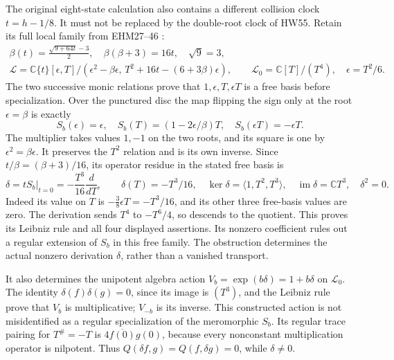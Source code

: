 \documentclass[11pt]{article}
\newcommand{\C}{\mathbb C}
\newcommand{\im}{\operatorname{im}}
\begin{document}
The original eight-state calculation also contains a different
collision clock \(t=h-1/8\). It must not be replaced by the
double-root clock of HW55. Retain its full local family
from EHM27--46 \cite{EHM}:
\[
 \begin{gathered}
 \beta(t)=\frac{\sqrt{9+64t}-3}{2},\quad
 \beta(\beta+3)=16t,\quad \sqrt{9}=3,\\
 \mathscr L=
 \C\{t\}[\epsilon,T]/
       (\epsilon^2-\beta\epsilon,\,
          T^2+16t-(6+3\beta)\epsilon),\qquad
 \mathscr L_0=\C[T]/(T^4),\quad \epsilon=T^2/6 .
 \end{gathered}
 \tag{HW61}
\]
The two successive monic relations prove that
\(1,\epsilon,T,\epsilon T\) is a free basis before
specialization. Over the punctured disc the map flipping
the sign only at the root \(\epsilon=\beta\) is exactly
\[
 S_b(\epsilon)=\epsilon,\quad
 S_b(T)=(1-2\epsilon/\beta)T,\quad
 S_b(\epsilon T)=-\epsilon T.
 \tag{HW62}
\]
The multiplier takes values \(1,-1\) on the two roots,
and its square is one by \(\epsilon^2=\beta\epsilon\).
It preserves the \(T^2\) relation and is its own inverse.
Since \(t/\beta=(\beta+3)/16\), its operator residue
in the stated free basis is
\[
 \delta=\left.tS_b\right|_{t=0}
     =-\frac{T^3}{16}\frac{d}{dT},\qquad
 \delta(T)=-T^3/16,\quad
 \ker\delta=\langle1,T^2,T^3\rangle,\quad
 \im\delta=\C T^3,\quad \delta^2=0.
 \tag{HW63}
\]
Indeed its value on \(T\) is
\(-\frac38\epsilon T=-T^3/16\), and its other three
free-basis values are zero. The derivation sends \(T^4\)
to \(-T^6/4\), so descends to the quotient. This proves
its Leibniz rule and all four displayed assertions.
Its nonzero coefficient rules out a regular extension
of \(S_b\) in this free family. The obstruction determines
the actual nonzero derivation \(\delta\), rather than a
vanished transport.

It also determines the unipotent algebra action
\(V_b=\exp(b\delta)=1+b\delta\) on \(\mathscr L_0\).
The identity
\(\delta(f)\delta(g)=0\), since its image is \((T^3)\),
and the Leibniz rule prove that \(V_b\) is multiplicative;
\(V_{-b}\) is its inverse. This constructed action is not
misidentified as a regular specialization of the
meromorphic \(S_b\).
Its regular trace pairing for \(T^\#=-T\) is
\(4\overline{f(0)}g(0)\), because every nonconstant
multiplication operator is nilpotent. Thus
\(Q(\delta f,g)=Q(f,\delta g)=0\), while \(\delta\ne0\).
\end{document}
